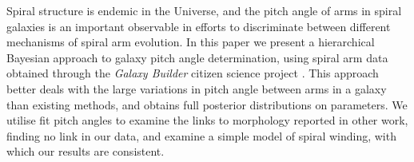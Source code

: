 Spiral structure is endemic in the Universe, and the pitch angle of arms in spiral galaxies is an important observable in efforts to discriminate between different mechanisms of spiral arm evolution. In this paper we present a hierarchical Bayesian approach to galaxy pitch angle determination, using spiral arm data obtained through the \textit{Galaxy Builder} citizen science project {\Lingard}. This approach better deals with the large variations in pitch angle between arms in a galaxy than existing methods, and obtains full posterior distributions on parameters. We utilise fit pitch angles to examine the links to morphology reported in other work, finding no link in our data, and examine a simple model of spiral winding, with which our results are consistent.
